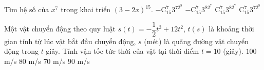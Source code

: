 	\begin{ex}%
		Tìm hệ số của $x^7$ trong khai triển $\left(3-2x\right)^{15}$.
		\choice
		{$-\mathrm{C}^7_{15}3^72^8$}
		{\True $-\mathrm{C}^7_{15}3^82^7$}
		{$\mathrm{C}^7_{15}3^82^7$}
		{$\mathrm{C}^7_{15}3^72^8$}
	\end{ex}
	
	\begin{ex}%
		Một vật chuyển động theo quy luật $s(t)=-\dfrac{1}{2}t^3+12t^2$, $t(s)$ là khoảng thời gian tính từ lúc vật bắt đầu chuyển động, $s$ (mét) là quãng đường vật chuyển động trong $t$ giây. Tính vận tốc tức thời của vật tại thời điểm $t=10$ (giây).
		\choice
		{$100$ m/s}
		{$80$ m/s}
		{$70$ m/s}
		{\True $90$ m/s}
	\end{ex}
	
